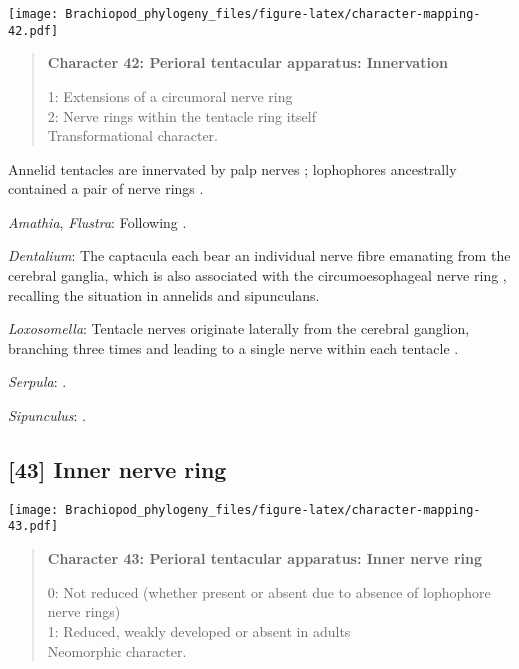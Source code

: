 \documentclass[openany]{book}
\theoremstyle{definition}
\theoremstyle{definition}
\theoremstyle{definition}
\theoremstyle{remark}
\begin{document}
\texttt{[image: Brachiopod\_phylogeny\_files/figure-latex/character-mapping-42.pdf]}

\begin{quote}
\textbf{Character 42: Perioral tentacular apparatus: Innervation}

1: Extensions of a circumoral nerve ring\\
2: Nerve rings within the tentacle ring itself\\
Transformational character.
\end{quote}

Annelid tentacles are innervated by palp nerves \citep{Orrhage2005};
lophophores ancestrally contained a pair of nerve rings
\citep{Temereva2017Innervationof}.

\hypertarget{Amathia-coding-42}{}
\emph{Amathia}, \emph{Flustra}: Following
\citet{Temereva2017Innervationof}.

\hypertarget{Dentalium-coding-42}{}
\emph{Dentalium}: The captacula each bear an individual nerve fibre
emanating from the cerebral ganglia, which is also associated with the
circumoesophageal nerve ring \citep{SumnerRooney2015}, recalling the
situation in annelids and sipunculans.

\hypertarget{Loxosomella-coding-42}{}
\emph{Loxosomella}: Tentacle nerves originate laterally from the
cerebral ganglion, branching three times and leading to a single nerve
within each tentacle \citep{Fuchs2006}.

\hypertarget{Serpula-coding-42}{}
\emph{Serpula}: \citet{Orrhage2005}.

\hypertarget{Sipunculus-coding-42}{}
\emph{Sipunculus}: \citet{Rice1993}.

\subsection*{{[}43{]} Inner nerve ring}\label{inner-nerve-ring}

\texttt{[image: Brachiopod\_phylogeny\_files/figure-latex/character-mapping-43.pdf]}

\begin{quote}
\textbf{Character 43: Perioral tentacular apparatus: Inner nerve ring}

0: Not reduced (whether present or absent due to absence of lophophore
nerve rings)\\
1: Reduced, weakly developed or absent in adults\\
Neomorphic character.
\end{quote}
\end{document}

